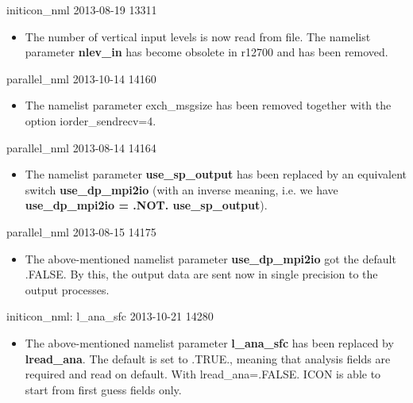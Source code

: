 \begin{changeitem}{initicon\_nml}{ 2013-08-19 }{ 13311 }
  \begin{itemize}
   \item The number of vertical input levels is now read from file.
         The namelist parameter \textbf{nlev\_in} has become obsolete in r12700 and has been removed.
  \end{itemize}
\end{changeitem}

\begin{changeitem}{parallel\_nml}{ 2013-10-14 }{ 14160 }
  \begin{itemize}
   \item The namelist parameter exch\_msgsize has been removed together with the option iorder\_sendrecv=4.
  \end{itemize}
\end{changeitem}

\begin{changeitem}{parallel\_nml}{ 2013-08-14 }{ 14164 }
  \begin{itemize}
   \item The namelist parameter \textbf{use\_sp\_output} has been replaced by an equivalent switch \textbf{use\_dp\_mpi2io}
         (with an inverse meaning, i.e. we have \textbf{use\_dp\_mpi2io = .NOT. use\_sp\_output}).
  \end{itemize}
\end{changeitem}

\begin{changeitem}{parallel\_nml}{ 2013-08-15 }{ 14175 }
  \begin{itemize}
   \item The above-mentioned namelist parameter \textbf{use\_dp\_mpi2io} got the default
         .FALSE. By this, the output data are sent now in single precision to the output processes.
  \end{itemize}
\end{changeitem}

\begin{changeitem}{initicon\_nml: l\_ana\_sfc}{ 2013-10-21 }{ 14280 }
  \begin{itemize}
   \item The above-mentioned namelist parameter \textbf{l\_ana\_sfc} has been replaced by \textbf{lread\_ana}. The default 
         is set to .TRUE., meaning that analysis fields are required and read on default. With lread\_ana=.FALSE. ICON is able to start from 
         first guess fields only.
  \end{itemize}
\end{changeitem}

